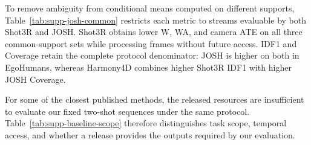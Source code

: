 \begin{table}[t]
  \centering
  \caption{JOSH execution and evaluable cases on the three primary protocols.
  Failed runs remain in the IDF1/Coverage calculations over all sequences;
  unavailable human or camera errors are omitted rather than set to zero.}
  \label{tab:supp-josh-support}
  \supptablesize
  
\end{table}

To remove ambiguity from conditional means computed on different supports,
Table~\ref{tab:supp-josh-common} restricts each metric to streams evaluable by
both Shot3R and JOSH. Shot3R obtains lower W, WA, and camera ATE on all three
common-support sets while processing frames without future access. IDF1 and
Coverage retain the complete protocol denominator: JOSH is higher on both in
EgoHumans, whereas Harmony4D combines higher Shot3R IDF1 with higher JOSH
Coverage.

\begin{table}[t]
  \centering
  \caption{Case-macro Shot3R--JOSH comparison restricted to streams evaluable
  by both methods. W/WA are in mm; ATE is Sim(3)-aligned for EgoBody and
  Harmony4D and SE(3)-aligned for EgoHumans, in m.}
  \label{tab:supp-josh-common}
  \supptablesize
  
\end{table}

\begin{table}[t]
  \centering
  \caption{Paired Shot3R gain over OnlineHMR with 95\% clustered bootstrap
  intervals. Positive values favour Shot3R.}
  \label{tab:supp-onlinehmr-paired}
  \supptablesize
  
\end{table}

For some of the closest published methods, the released resources are
insufficient to evaluate our fixed two-shot sequences under the same protocol.
Table~\ref{tab:supp-baseline-scope} therefore distinguishes task scope,
temporal access, and whether a release provides the outputs required by our
evaluation.

